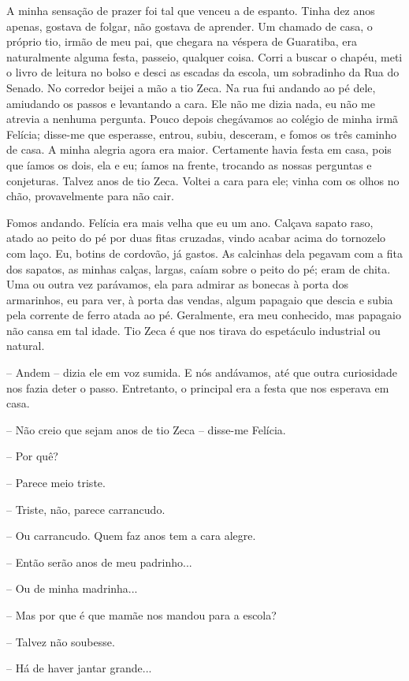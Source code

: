 A minha sensação de prazer foi tal que venceu a de espanto. Tinha dez
anos apenas, gostava de folgar, não gostava de aprender. Um chamado de
casa, o próprio tio, irmão de meu pai, que chegara na véspera de
Guaratiba, era naturalmente alguma festa, passeio, qualquer coisa. Corri
a buscar o chapéu, meti o livro de leitura no bolso e desci as escadas
da escola, um sobradinho da Rua do Senado. No corredor beijei a mão a
tio Zeca. Na rua fui andando ao pé dele, amiudando os passos e
levantando a cara. Ele não me dizia nada, eu não me atrevia a nenhuma
pergunta. Pouco depois chegávamos ao colégio de minha irmã Felícia;
disse-me que esperasse, entrou, subiu, desceram, e fomos os três caminho
de casa. A minha alegria agora era maior. Certamente havia festa em
casa, pois que íamos os dois, ela e eu; íamos na frente, trocando as
nossas perguntas e conjeturas. Talvez anos de tio Zeca. Voltei a cara
para ele; vinha com os olhos no chão, provavelmente para não cair.

Fomos andando. Felícia era mais velha que eu um ano. Calçava sapato
raso, atado ao peito do pé por duas fitas cruzadas, vindo acabar acima
do tornozelo com laço. Eu, botins de cordovão, já gastos. As calcinhas
dela pegavam com a fita dos sapatos, as minhas calças, largas, caíam
sobre o peito do pé; eram de chita. Uma ou outra vez parávamos, ela para
admirar as bonecas à porta dos armarinhos, eu para ver, à porta das
vendas, algum papagaio que descia e subia pela corrente de ferro atada
ao pé. Geralmente, era meu conhecido, mas papagaio não cansa em tal
idade. Tio Zeca é que nos tirava do espetáculo industrial ou natural.

-- Andem -- dizia ele em voz sumida. E nós andávamos, até que outra
curiosidade nos fazia deter o passo. Entretanto, o principal era a festa
que nos esperava em casa.

-- Não creio que sejam anos de tio Zeca -- disse-me Felícia.

-- Por quê?

-- Parece meio triste.

-- Triste, não, parece carrancudo.

-- Ou carrancudo. Quem faz anos tem a cara alegre.

-- Então serão anos de meu padrinho...

-- Ou de minha madrinha...

-- Mas por que é que mamãe nos mandou para a escola?

-- Talvez não soubesse.

-- Há de haver jantar grande...

